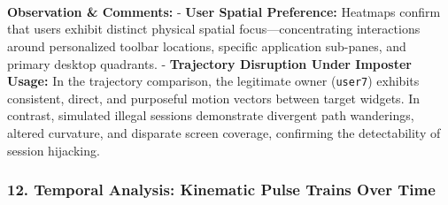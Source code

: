 \documentclass[11pt]{article}
\begin{document}
    \begin{center}
    \end{center}
    { \hspace*{\fill} \\}
    
    \begin{center}
    \end{center}
    { \hspace*{\fill} \\}
    
    \begin{center}
    \end{center}
    { \hspace*{\fill} \\}
    
    \textbf{Observation \& Comments:} - \textbf{User Spatial Preference:}
Heatmaps confirm that users exhibit distinct physical spatial
focus---concentrating interactions around personalized toolbar
locations, specific application sub-panes, and primary desktop
quadrants. - \textbf{Trajectory Disruption Under Imposter Usage:} In the
trajectory comparison, the legitimate owner (\texttt{user7}) exhibits
consistent, direct, and purposeful motion vectors between target
widgets. In contrast, simulated illegal sessions demonstrate divergent
path wanderings, altered curvature, and disparate screen coverage,
confirming the detectability of session hijacking.

    \subsubsection{12. Temporal Analysis: Kinematic Pulse Trains Over
Time}\label{temporal-analysis-kinematic-pulse-trains-over-time}
\end{document}
